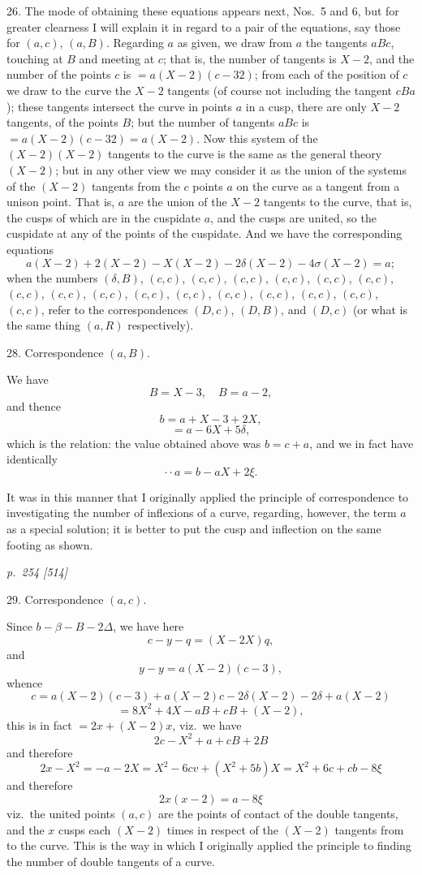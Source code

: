 \documentclass[11pt,a4paper]{article}
\theoremstyle{plain}
\theoremstyle{definition}
\begin{document}
26.  The mode of obtaining these equations appears next, Nos.~5 and 6, but for
greater clearness I will explain it in regard to a pair of the equations, say those for
$(a, c)$, $(a, B)$.  Regarding $a$ as given, we draw from $a$ the tangents $aBc$, touching at
$B$ and meeting at $c$; that is, the number of tangents is $X - 2$, and the
number of the points $c$ is $= a(X - 2)(c - 32)$; from each of the position of $c$ we draw
to the curve the $X - 2$ tangents (of course not including the tangent $cBa$); these
tangents intersect the curve in points $a$ in a cusp, there are only $X - 2$ tangents,
of the points $B$; but the number of tangents $aBc$ is $= a(X - 2)(c - 32) = a(X - 2)$.
Now this system of the $(X - 2)(X - 2)$ tangents to the curve is the same as the general
theory $(X - 2)$; but in any other view we may consider it as the union of the systems
of the $(X - 2)$ tangents from the $c$ points $a$ on the curve as a tangent from a unison
point. That is, $a$ are the union of the $X - 2$ tangents to the curve, that is, the cusps of
which are in the cuspidate $a$, and the cusps are united, so the cuspidate at any of
the points of the cuspidate. And we have the corresponding equations
\[
a(X - 2) + 2(X - 2) - X(X - 2) - 2\delta(X - 2) - 4\sigma(X - 2) = a;
\]
when the numbers $(\delta, B)$, $(c, c)$, $(c, c)$, $(c, c)$, $(c, c)$, $(c, c)$, $(c, c)$, $(c, c)$, $(c, c)$, $(c, c)$, $(c, c)$, $(c, c)$, $(c, c)$, $(c, c)$, $(c, c)$, $(c, c)$, $(c, c)$, refer to the correspondences $(D, c)$,
$(D, B)$, and $(D, c)$ (or what is the same thing $(a, R)$ respectively).

28.  Correspondence $(a, B)$.

We have
\[
B = X - 3, \quad B = a - 2,
\]
and thence
\[
b = a + X - 3 + 2X,
\]
\[
= a - 6X + 5\delta,
\]
which is the relation: the value obtained above was $b = c + a$, and we in fact have
identically
\[
\cdot \cdot a = b - aX + 2\xi.
\]

It was in this manner that I originally applied the principle of correspondence to
investigating the number of inflexions of a curve, regarding, however, the term $a$ as
a special solution; it is better to put the cusp and inflection on the same footing
as shown.

\clearpage

\bigskip
\textit{p.~254 [514]}
\smallskip

29.  Correspondence $(a, c)$.

Since $b - \beta - B - 2\Delta$, we have here
\[
c - y - q = (X - 2X)q,
\]
and
\[
y - y = a(X - 2)(c - 3),
\]
whence
\[
c = a(X - 2)(c - 3) + a(X - 2)c - 2\delta(X - 2) - 2\delta + a(X - 2)
\]
\[
= 8X^2 + 4X - aB + cB + (X - 2),
\]
this is in fact $= 2x + (X - 2)x$, viz.\ we have
\[
2c - X^2 + a + cB + 2B
\]
and therefore
\[
2x - X^2 = -a - 2X = X^2 - 6cv + (X^2 + 5b)X = X^2 + 6c + cb - 8\xi
\]
and therefore
\[
2x(x - 2) = a - 8\xi
\]
viz.\ the united points $(a, c)$ are the points of contact of the double tangents, and
the $x$ cusps each $(X - 2)$ times in respect of the $(X - 2)$ tangents from to the
curve.  This is the way in which I originally applied the principle to finding the
number of double tangents of a curve.
\end{document}
